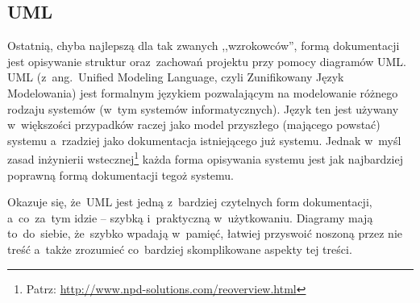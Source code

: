\subsection{UML} \label{dokumentacja.uml}

Ostatnią, chyba najlepszą dla tak zwanych ,,wzrokowców'', formą dokumentacji jest opisywanie struktur oraz~zachowań projektu przy pomocy diagramów UML. UML (z~ang.~Unified Modeling Language, czyli Zunifikowany Język Modelowania) jest formalnym językiem pozwalającym na modelowanie różnego rodzaju systemów (w~tym systemów informatycznych). Język ten jest używany w~większości przypadków raczej jako model przyszłego (mającego powstać) systemu a~rzadziej jako dokumentacja istniejącego już systemu. Jednak w~myśl zasad inżynierii wstecznej\footnote{Patrz: \url{http://www.npd-solutions.com/reoverview.html}} każda forma opisywania systemu jest jak najbardziej poprawną formą dokumentacji tegoż systemu.


Okazuje się, że~UML jest jedną z~bardziej czytelnych form dokumentacji, a~co~za~tym idzie -- szybką i~praktyczną w~użytkowaniu. Diagramy mają to~do~siebie, że~szybko wpadają w~pamięć, łatwiej przyswoić noszoną przez nie treść a~także zrozumieć co~bardziej skomplikowane aspekty tej treści.
